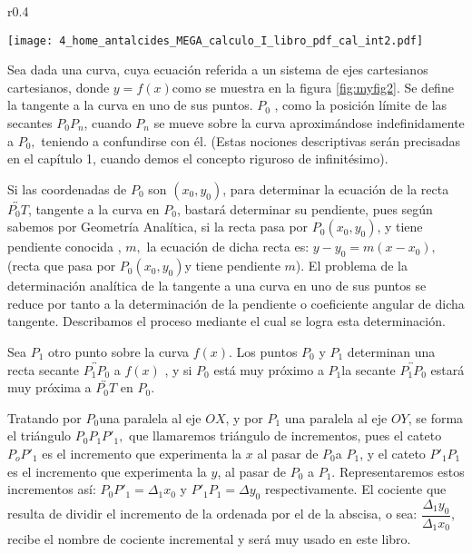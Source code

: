 \begin{solucion}

\begin{wrapfigure}{r}{0.4\linewidth} \centering

\texttt{[image: 4\_home\_antalcides\_MEGA\_calculo\_I\_libro\_pdf\_cal\_int2.pdf]}
\caption{Recta tangente a $f(x)$.}
\label{fig:myfig2} \end{wrapfigure}

Sea dada una curva, cuya ecuación referida  a un sistema de ejes cartesianos
cartesianos, donde $y=f(x)$como se muestra en la figura \ref{fig:myfig2}.
Se define la tangente a la curva en uno de sus puntos. $P_{0}$ ,
como la posición límite de las secantes $P_{0}P_{n}$, cuando $P_{n}$
se mueve sobre la curva aproximándose indefinidamente a $P_{0},$
teniendo a confundirse con él. (Estas nociones descriptivas serán
precisadas en el capítulo 1, cuando demos el concepto riguroso de
infinitésimo). 

Si las coordenadas de $P_{0}$ son $(x_{0},y_{0})$, para determinar
la ecuación de la recta $\overleftrightarrow{P_{0}T}$, tangente a
la curva en $P_{0}$, bastará determinar su pendiente, pues según
sabemos por Geometría Analítica, si la recta pasa por $P_{0}(x_{0},y_{0})$,
y tiene pendiente conocida , $m,$ la ecuación de dicha recta es:
$y-y_{0}=m\left(x-x_{0}\right),$ (recta que pasa por $P_{0}\left(x_{0},y_{0}\right)$y
tiene pendiente $m$). El problema de la determinación analítica de
la tangente a una curva en uno de sus puntos se reduce por tanto a
la determinación de la pendiente o coeficiente angular de dicha tangente.
Describamos el proceso mediante el cual se logra esta determinación. 

Sea $P_{1}$ otro punto sobre la curva $f(x)$. Los puntos $P_{0}$
y $P_{1}$ determinan una recta secante $\overleftrightarrow{P_{1}P_{0}}$
a $f\left(x\right)$ , y si $P_{0}$ está muy próximo a $P_{1}$la
secante $\overleftrightarrow{P_{1}P_{0}}$ estará muy próxima a $\overleftrightarrow{P_{0}T}$
en $P_{0}$.

Tratando por $P_{0}$una paralela al eje $OX$, y por $P_{1}$ una
paralela al eje $OY$, se forma el triángulo $P_{0}P_{1}P'_{1},$
que llamaremos triángulo de incrementos, pues el cateto $P_{o}P'_{1}$
es el incremento que experimenta la $x$ al pasar de $P_{0}$a $P_{1}$,
y el cateto $P'_{1}P_{1}$es el incremento que experimenta la $y$,
al pasar de $P_{0}$ a $P_{1}$. Representaremos estos incrementos
así: $P_{0}P'_{1}=\Delta_{1}x_{0}$ y $P'_{1}P_{1}=\Delta y_{0}$
respectivamente. El cociente que resulta de dividir el incremento
de la ordenada por el de la abscisa, o sea: $\dfrac{\Delta_{1}y_{0}}{\Delta_{1}x_{0}},$
recibe el nombre de cociente incremental y será muy usado en este
libro.


\end{solucion}
